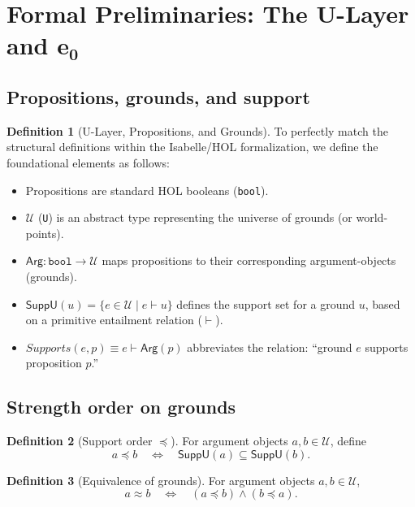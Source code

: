 \documentclass[a4paper, 11pt]{article}
\theoremstyle{plain}
\theoremstyle{definition}
\newtheorem{definition}{Definition}[section]
\newcommand{\U}{\mathcal{U}}               %
\newcommand{\SuppU}{\mathsf{SuppU}}       %
\newcommand{\Arg}{\mathsf{Arg}}           %
\newcommand{\eZero}{\mathbf{e_0}}         %
\begin{document}

\section{Formal Preliminaries: The U-Layer and $\eZero$}
\label{sec:prelimaries}

\subsection{Propositions, grounds, and support}
\begin{definition}[U-Layer, Propositions, and Grounds]
\label{def:ulayer}
To perfectly match the structural definitions within the Isabelle/HOL formalization, we define the foundational elements as follows:
\begin{itemize}
  \item Propositions are standard HOL booleans (\texttt{bool}).
  \item $\U$ (\texttt{U}) is an abstract type representing the universe of grounds (or world-points).
  \item $\Arg : \texttt{bool} \to \U$ maps propositions to their corresponding argument-objects (grounds).
  \item $\SuppU(u) = \{ e \in \U \mid e \vdash u \}$ defines the support set for a ground $u$, based on a primitive entailment relation ($\vdash$).
  \item $Supports(e, p) \equiv e \vdash \Arg(p)$ abbreviates the relation: ``ground $e$ supports proposition $p$.''
\end{itemize}
\end{definition}

\subsection{Strength order on grounds}
\begin{definition}[Support order $\preceq$]
\label{def:preceq}
For argument objects $a, b \in \U$, define
\[
a \preceq b \quad \Longleftrightarrow \quad \SuppU(a) \subseteq \SuppU(b).
\]
\end{definition}

\begin{definition}[Equivalence of grounds]
\label{def:eq}
For argument objects $a, b \in \U$,
\[
a \approx b \quad \Longleftrightarrow \quad (a \preceq b)\land(b \preceq a).
\]
\end{definition}
\end{document}
